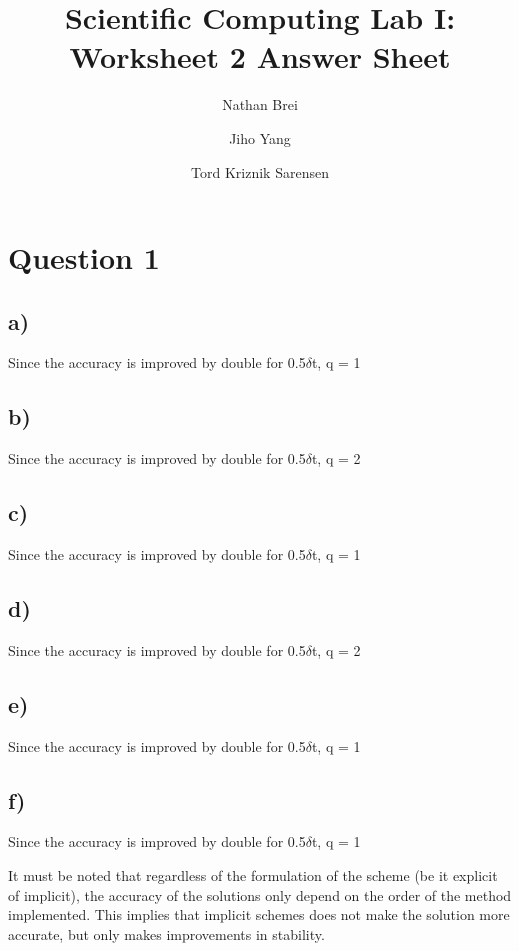 \documentclass[preprint,authoryear,10pt]{elsarticle}
\begin{document}
\begin{frontmatter}

\title{Scientific Computing Lab I: Worksheet 2 Answer Sheet}
\author{Nathan Brei}
\author{Jiho Yang}
\author{Tord Kriznik Sarensen}

\end{frontmatter}

\linenumbers

\section{Question 1}
\subsection{a)}

Since the accuracy is improved by double for 0.5$\delta$t, q = 1

\subsection{b)}

Since the accuracy is improved by double for 0.5$\delta$t, q = 2

\subsection{c)}

Since the accuracy is improved by double for 0.5$\delta$t, q = 1

\subsection{d)}

Since the accuracy is improved by double for 0.5$\delta$t, q = 2

\subsection{e)}

Since the accuracy is improved by double for 0.5$\delta$t, q = 1

\subsection{f)}

Since the accuracy is improved by double for 0.5$\delta$t, q = 1
\newline

It must be noted that regardless of the formulation of the scheme (be it explicit of implicit), the accuracy of the solutions only depend on the order of the method implemented. This implies that implicit schemes does not make the solution more accurate, but only makes improvements in stability. 
\newline
\end{document}
